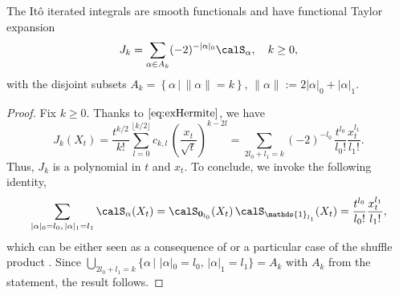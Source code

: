 \begin{lemma}\label{lem:hermite}
The It\^o iterated integrals are smooth functionals and have functional Taylor expansion
  \begin{align*}
      J_{k}
      = \sum_{\alpha \in A_k} (-2)^{-|\alpha|_0}  \calS_{\alpha},  \quad k \ge 0,
 \end{align*}
with  the disjoint subsets 
 $A_k = \left\{\alpha \, \big | \, \lVert \alpha\rVert = k \right\}$, $\lVert \alpha\rVert := 2|\alpha|_0 + |\alpha|_1$. 
\end{lemma}

\begin{proof}

Fix $k\ge 0$. Thanks to $\eqref{eq:exHermite}$, we have 
 \begin{equation}\label{eq:poly}
     J_k(X_t) = \frac{t^{k/2}}{k!} \sum_{l=0}^{\lfloor k/2 \rfloor} c_{k,l} \, \left(\frac{x_t}{\sqrt{t}}\right)^{k-2l}  = \sum_{2l_0+l_1=k} (-2)^{-l_0}  \, \frac{t^{l_0} }{l_{0}!}\frac{ x_t^{l_1}}{ l_{1}!}. 
 \end{equation}%
 Thus,  $J_k$ is a polynomial in $t$ and $x_t$. 
To conclude, we invoke the following identity,
 \begin{equation*}%
     \sum_{|\alpha|_0=l_0, \, |\alpha|_1=l_1 } \calS_{\alpha}(X_t) = \calS_{\boldsymbol{0}_{l_0}}(X_t)\, \calS_{\mathds{1}_{l_1}}(X_t) = \frac{t^{l_0} }{l_{0}!}\frac{ x_t^{l_1}}{ l_{1}!},
 \end{equation*}
 which can be  either seen as a consequence  of \cite[Proposition 5.2.10]{KP}  or a particular case of the shuffle product \cite{Ree}. Since $\bigcup\limits_{2l_0+l_1=k} \{\alpha\, |\,\, |\alpha|_0 =l_0, \, |\alpha|_1 =l_1\}=A_k$ with $A_k$ from the statement, the result follows. %
 

\end{proof}
